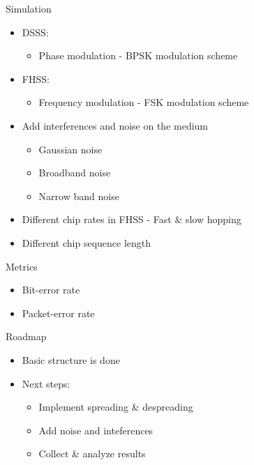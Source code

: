		\begin{frame}{Simulation}
			\begin{itemize}
				\item<1->
				DSSS:
				\begin{itemize}
				    \item Phase modulation - BPSK modulation scheme
				\end{itemize}
				
				\item<2->
				FHSS:
				\begin{itemize}
				    \item Frequency modulation - FSK modulation scheme
				\end{itemize}
				
				\item<3->
				Add interferences and noise on the medium
				\begin{itemize}
    				\item Gaussian noise
                    \item Broadband noise
                    \item Narrow band noise
				\end{itemize}
				
				\item<4->
				Different chip rates in FHSS - Fast \& slow hopping
				
				\item<5->
				Different chip sequence length
			\end{itemize}
		\end{frame}
		
		\begin{frame}{Metrics}
			\begin{itemize}
				\item<1->
				Bit-error rate
				
				\item<2->
				Packet-error rate
			\end{itemize}
		\end{frame}
		
		\begin{frame}{Roadmap}
			\begin{itemize}
				\item<1->
				Basic structure is done
				
				\item<2->
				Next steps:
				\begin{itemize}
    				\item<2-> Implement spreading \& despreading
    				\item<3-> Add noise and inteferences
    				\item<4-> Collect \& analyze results
				\end{itemize}
			\end{itemize}
		\end{frame}